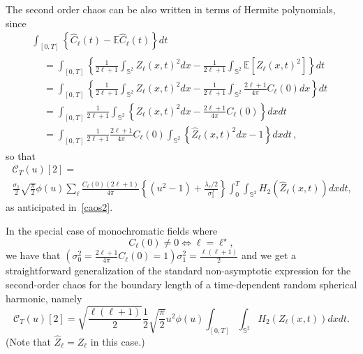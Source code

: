 \documentclass[AHL,Unicode,longabstracts,published]{cedram}
\newcommand{\clC}{\mathcal{C}}
\newcommand{\bbS}{\mathbb{S}}
\newcommand{\bbE}{\mathbb{E}}
\begin{document}
\begin{rema}\label{2chaos-hermite}
The second order chaos can be also written in terms of Hermite polynomials, since
\begin{multline*}
\int_{[0,T]}\left\{ \widehat{C}_{\ell }(t)-\bbE\widehat{C}_{\ell }(t)\right\} dt \\
\begin{aligned}
&= \int_{[0,T]}\left\{\frac{1}{2\ell+1}\int_{\bbS^2}Z_\ell(x,t)^2dx-
\frac{1}{2\ell+1}\int_{\bbS^2}\bbE\left[Z_\ell(x,t)^2\right]\right\} dt \\
&= \int_{[0,T]}\left\{\frac{1}{2\ell+1}\int_{\bbS^2}Z_\ell(x,t)^2dx-
\frac{1}{2\ell+1}\int_{\bbS^2}\frac{2\ell+1}{4\pi}C_{\ell }(0)dx\right\} dt \\
&= \int_{[0,T]}\frac{1}{2\ell+1}\int_{\bbS^2}\left\{Z_\ell(x,t)^2dx-
\frac{2\ell+1}{4\pi}C_{\ell }(0)\right\} dxdt \\
&= \int_{[0,T]}\frac{1}{2\ell+1}\frac{2\ell+1}{4\pi}C_{\ell }(0)\int_{
\bbS^2}\left\{\widehat Z_\ell(x,t)^2dx-1\right\}dxdt\,,
\end{aligned}
\end{multline*}
so that
\begin{multline*}
\clC_T(u)[2]=\\
\frac{\sigma _{1}}{2}\sqrt{\frac{\pi }{2}}\phi (u)\sum_{\ell } \frac{C_{\ell }(0)(2\ell +1)}{4\pi } \left\{\left(u^{2}-1\right)+\frac{\lambda _{\ell }/2}{\sigma _{1}^{2}}\right\} \int_0^T\int_{\bbS^{2}}H_{2}\left(\widehat Z_{\ell }(x,t)\right)dxdt\text{,}
\end{multline*}
as anticipated in~\eqref{caos2}.
\end{rema}

\begin{rema}\label{2chaos_mono}
In the special case of monochromatic fields where
\begin{equation*}
C_{\ell }(0)\neq 0\Leftrightarrow \ell =\ell ^{\star },
\end{equation*}
we have that $(\sigma^2_0= \frac{2\ell+1}{4\pi}C_\ell(0)=1)
\sigma^2 _{1}=\frac{\ell (\ell +1)}{2}$ and we get a straightforward generalization of the standard non-asymptotic expression for the second-order chaos for the boundary length of a time-dependent random spherical harmonic, namely
\[
\clC_T(u)[2] =\sqrt{\frac{\ell (\ell +1)}{2}}\frac{1}{2}\sqrt{\frac{
\pi }{2}}u^{2}\phi (u)\int_{[0,T]}\int_{\bbS^{2}} H_2(Z_\ell(x,t)) dxdt.
\]
(Note that $\widehat{Z}_\ell = Z_\ell$ in this case.)
\end{rema}
\end{document}
